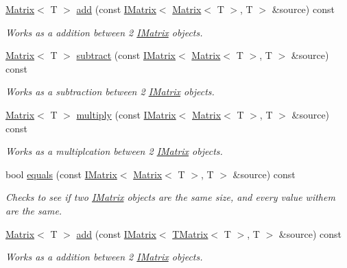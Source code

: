 \begin{DoxyCompactItemize}
\mbox{\hyperlink{class_matrix}{Matrix}}$<$ T $>$ \mbox{\hyperlink{class_l_matrix_a20e109f3a40b550fd2c918e3c16d2cb7}{add}} (const \mbox{\hyperlink{class_i_matrix}{I\+Matrix}}$<$ \mbox{\hyperlink{class_matrix}{Matrix}}$<$ T $>$, T $>$ \&source) const
\begin{DoxyCompactList}\small\item\em Works as a addition between 2 \mbox{\hyperlink{class_i_matrix}{I\+Matrix}} objects. \end{DoxyCompactList}\item 
\mbox{\hyperlink{class_matrix}{Matrix}}$<$ T $>$ \mbox{\hyperlink{class_l_matrix_a879cb328b94b4416855b1f15895b1691}{subtract}} (const \mbox{\hyperlink{class_i_matrix}{I\+Matrix}}$<$ \mbox{\hyperlink{class_matrix}{Matrix}}$<$ T $>$, T $>$ \&source) const
\begin{DoxyCompactList}\small\item\em Works as a subtraction between 2 \mbox{\hyperlink{class_i_matrix}{I\+Matrix}} objects. \end{DoxyCompactList}\item 
\mbox{\hyperlink{class_matrix}{Matrix}}$<$ T $>$ \mbox{\hyperlink{class_l_matrix_ab3ee1b0b67558d1633245180e72b9e33}{multiply}} (const \mbox{\hyperlink{class_i_matrix}{I\+Matrix}}$<$ \mbox{\hyperlink{class_matrix}{Matrix}}$<$ T $>$, T $>$ \&source) const
\begin{DoxyCompactList}\small\item\em Works as a multiplcation between 2 \mbox{\hyperlink{class_i_matrix}{I\+Matrix}} objects. \end{DoxyCompactList}\item 
bool \mbox{\hyperlink{class_l_matrix_a7879243ad84666fe92c449abfce41da5}{equals}} (const \mbox{\hyperlink{class_i_matrix}{I\+Matrix}}$<$ \mbox{\hyperlink{class_matrix}{Matrix}}$<$ T $>$, T $>$ \&source) const
\begin{DoxyCompactList}\small\item\em Checks to see if two \mbox{\hyperlink{class_i_matrix}{I\+Matrix}} objects are the same size, and every value withem are the same. \end{DoxyCompactList}\item 
\mbox{\hyperlink{class_matrix}{Matrix}}$<$ T $>$ \mbox{\hyperlink{class_l_matrix_ad6ad95313a5ccca45dc825dce5ff3d13}{add}} (const \mbox{\hyperlink{class_i_matrix}{I\+Matrix}}$<$ \mbox{\hyperlink{class_t_matrix}{T\+Matrix}}$<$ T $>$, T $>$ \&source) const
\begin{DoxyCompactList}\small\item\em Works as a addition between 2 \mbox{\hyperlink{class_i_matrix}{I\+Matrix}} objects. \end{DoxyCompactList}\item 

\end{DoxyCompactItemize}
